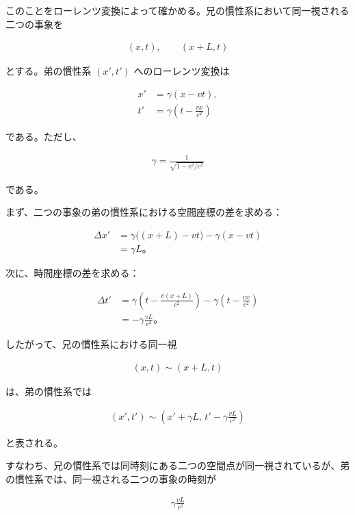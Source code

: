 \documentclass[platex,dvipdfmx,a4paper]{jsarticle}
\begin{document}
このことをローレンツ変換によって確かめる。兄の慣性系において同一視される二つの事象を

\begin{align*}
  (x,t),\qquad (x+L,t)
\end{align*}

とする。弟の慣性系 \((x',t')\) へのローレンツ変換は

\begin{align*}
  x'&=\gamma(x-vt), \\
  t'&=\gamma\left(t-\frac{vx}{c^2}\right)
\end{align*}

である。ただし、

\begin{align*}
  \gamma=\frac{1}{\sqrt{1-v^2/c^2}}
\end{align*}

である。

まず、二つの事象の弟の慣性系における空間座標の差を求める：

\begin{align*}
  \Delta x'
    &=\gamma\bigl((x+L)-vt\bigr)-\gamma(x-vt) \\
    &=\gamma L。
\end{align*}

次に、時間座標の差を求める：

\begin{align*}
  \Delta t'
    &=\gamma\left(t-\frac{v(x+L)}{c^2}\right)
      -\gamma\left(t-\frac{vx}{c^2}\right) \\
    &=-\gamma\frac{vL}{c^2}。
\end{align*}

したがって、兄の慣性系における同一視

\begin{align*}
  (x,t)\sim(x+L,t)
\end{align*}

は、弟の慣性系では

\begin{align*}
  (x',t')
  \sim
  \left(
    x'+\gamma L,\,
    t'-\gamma\frac{vL}{c^2}
  \right)
\end{align*}

と表される。

すなわち、兄の慣性系では同時刻にある二つの空間点が同一視されているが、弟の慣性系では、同一視される二つの事象の時刻が

\begin{align*}
  \gamma\frac{vL}{c^2}
\end{align*}
\end{document}
